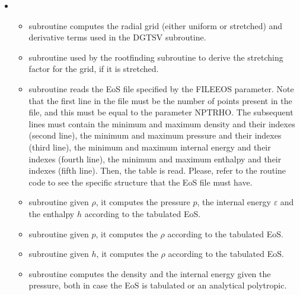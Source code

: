 \documentclass[letterpaper,10pt,english]{sphinxmanual}
\begin{document}
\begin{itemize}
\begin{itemize}
\end{itemize}

\item {} 
\sphinxAtStartPar
{}
\begin{itemize}
\item {} 
\sphinxAtStartPar
subroutine  \sphinxhyphen{} computes the radial grid (either uniform or stretched) and derivative terms used in the DGTSV subroutine.

\item {} 
\sphinxAtStartPar
subroutine  \sphinxhyphen{} used by the root\sphinxhyphen{}finding subroutine to derive the stretching factor for the grid, if it is stretched.

\item {} 
\sphinxAtStartPar
subroutine  \sphinxhyphen{} reads the EoS file specified by the FILEEOS parameter. Note that the first line in the file must be the number of points present in the file, and this must be equal to the parameter NPTRHO. The subsequent lines must contain the minimum and maximum density and their indexes (second line), the minimum and maximum pressure and their indexes (third line), the minimum and maximum internal energy and their indexes (fourth line), the minimum and maximum enthalpy and their indexes (fifth line). Then, the table is read. Please, refer to the routine code to see the specific structure that the EoS file must have.

\item {} 
\sphinxAtStartPar
subroutine  \sphinxhyphen{} given \(\rho\), it computes the pressure \(p\), the internal energy \(\varepsilon\) and the enthalpy \(h\) according to the tabulated EoS.

\item {} 
\sphinxAtStartPar
subroutine  \sphinxhyphen{} given \(p\), it computes the \(\rho\) according to the tabulated EoS.

\item {} 
\sphinxAtStartPar
subroutine  \sphinxhyphen{} given \(h\), it computes the \(\rho\) according to the tabulated EoS.

\item {} 
\sphinxAtStartPar
subroutine  \sphinxhyphen{} computes the density and the internal energy given the pressure, both in case the EoS is tabulated or an analytical polytropic.


\end{itemize}
\end{itemize}
\end{document}
